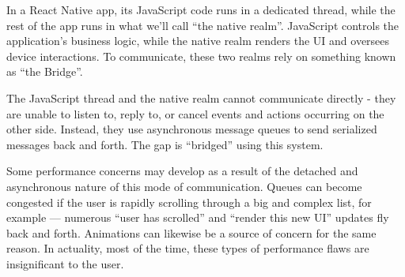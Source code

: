 In a React Native app, its JavaScript code runs in a dedicated thread, while the rest of the app runs in what we’ll
call ``the native realm''.
JavaScript controls the application's business logic, while the native realm renders the UI and oversees device
interactions.
To communicate, these two realms rely on something known as ``the Bridge''.

The JavaScript thread and the native realm cannot communicate directly - they are unable to listen to, reply to, or
cancel events and actions occurring on the other side.
Instead, they use asynchronous message queues to send serialized messages back and forth.
The gap is ``bridged'' using this system.

Some performance concerns may develop as a result of the detached and asynchronous nature of this mode of
communication.
Queues can become congested if the user is rapidly scrolling through a big and complex list, for example — numerous
``user has scrolled'' and ``render this new UI'' updates fly back and forth.
Animations can likewise be a source of concern for the same reason.
In actuality, most of the time, these types of performance flaws are insignificant to the user.
